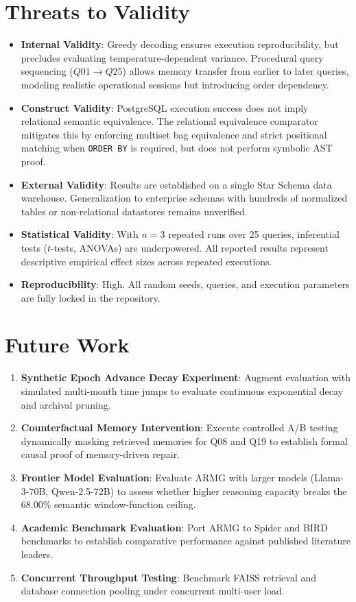 \section{Threats to Validity}
\begin{itemize}
    \item \textbf{Internal Validity}: Greedy decoding ensures execution reproducibility, but precludes evaluating temperature-dependent variance. Procedural query sequencing ($Q01 \to Q25$) allows memory transfer from earlier to later queries, modeling realistic operational sessions but introducing order dependency.
    \item \textbf{Construct Validity}: PostgreSQL execution success does not imply relational semantic equivalence. The relational equivalence comparator mitigates this by enforcing multiset bag equivalence and strict positional matching when \texttt{ORDER BY} is required, but does not perform symbolic AST proof.
    \item \textbf{External Validity}: Results are established on a single Star Schema data warehouse. Generalization to enterprise schemas with hundreds of normalized tables or non-relational datastores remains unverified.
    \item \textbf{Statistical Validity}: With $n = 3$ repeated runs over 25 queries, inferential tests ($t$-tests, ANOVAs) are underpowered. All reported results represent descriptive empirical effect sizes across repeated executions.
    \item \textbf{Reproducibility}: High. All random seeds, queries, and execution parameters are fully locked in the repository.
\end{itemize}

\section{Future Work}
\begin{enumerate}
    \item \textbf{Synthetic Epoch Advance Decay Experiment}: Augment evaluation with simulated multi-month time jumps to evaluate continuous exponential decay and archival pruning.
    \item \textbf{Counterfactual Memory Intervention}: Execute controlled A/B testing dynamically masking retrieved memories for Q08 and Q19 to establish formal causal proof of memory-driven repair.
    \item \textbf{Frontier Model Evaluation}: Evaluate ARMG with larger models (Llama-3-70B, Qwen-2.5-72B) to assess whether higher reasoning capacity breaks the 68.00\% semantic window-function ceiling.
    \item \textbf{Academic Benchmark Evaluation}: Port ARMG to Spider and BIRD benchmarks to establish comparative performance against published literature leaders.
    \item \textbf{Concurrent Throughput Testing}: Benchmark FAISS retrieval and database connection pooling under concurrent multi-user load.
\end{enumerate}


